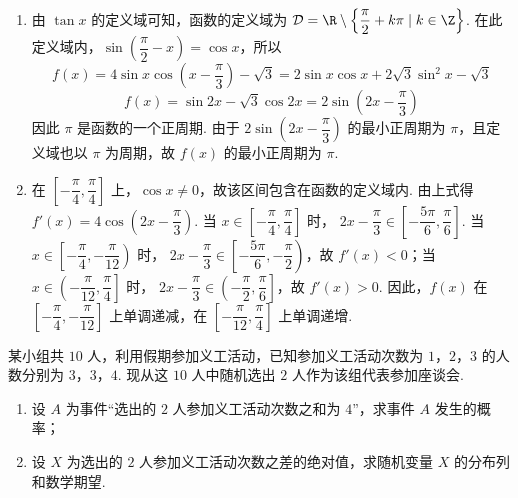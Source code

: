 \begin{solution}
\begin{enumerate}
\item 由 \(\tan x\) 的定义域可知，函数的定义域为
\(\mathcal D=\R\mathbin{\backslash}\left\{\dfrac\pi2+k\pi\mid k\in\Z\right\}\).
在此定义域内，\(\sin\left(\dfrac\pi2-x\right)=\cos x\)，所以
\[
f(x)=4\sin x\cos\left(x-\dfrac\pi3\right)-\sqrt3
 =2\sin x\cos x+2\sqrt3\sin^2x-\sqrt3
\]
\[
f(x)=\sin 2x-\sqrt3\cos 2x=2\sin\left(2x-\dfrac\pi3\right)
\]
因此 \(\pi\) 是函数的一个正周期. 由于 \(2\sin\left(2x-\dfrac\pi3\right)\) 的最小正周期为 \(\pi\)，且定义域也以 \(\pi\) 为周期，故 \(f(x)\) 的最小正周期为 \(\pi\).

\item 在 \(\left[-\dfrac\pi4,\dfrac\pi4\right]\) 上，\(\cos x\neq0\)，故该区间包含在函数的定义域内. 由上式得
\(f'(x)=4\cos\left(2x-\dfrac\pi3\right)\).
当 \(x\in\left[-\dfrac\pi4,\dfrac\pi4\right]\) 时，
\(2x-\dfrac\pi3\in\left[-\dfrac{5\pi}{6},\dfrac\pi6\right]\). 当
\(x\in\left[-\dfrac\pi4,-\dfrac\pi{12}\right)\) 时，
\(2x-\dfrac\pi3\in\left[-\dfrac{5\pi}{6},-\dfrac\pi2\right)\)，故
\(f'(x)<0\)；当 \(x\in\left(-\dfrac\pi{12},\dfrac\pi4\right]\) 时，
\(2x-\dfrac\pi3\in\left(-\dfrac\pi2,\dfrac\pi6\right]\)，故 \(f'(x)>0\).
因此，\(f(x)\) 在 \(\left[-\dfrac\pi4,-\dfrac\pi{12}\right]\) 上单调递减，在
\(\left[-\dfrac\pi{12},\dfrac\pi4\right]\) 上单调递增.
\end{enumerate}
\end{solution}

\begin{problem}
某小组共 \(10\) 人，利用假期参加义工活动，已知参加义工活动次数为 \(1\)，\(2\)，\(3\) 的人数分别为 \(3\)，\(3\)，\(4\). 现从这 \(10\) 人中随机选出 \(2\) 人作为该组代表参加座谈会.

\begin{enumerate}
\item 设 \(A\) 为事件“选出的 \(2\) 人参加义工活动次数之和为 \(4\)”，求事件 \(A\) 发生的概率；
\item 设 \(X\) 为选出的 \(2\) 人参加义工活动次数之差的绝对值，求随机变量 \(X\) 的分布列和数学期望.
\end{enumerate}
\end{problem}

